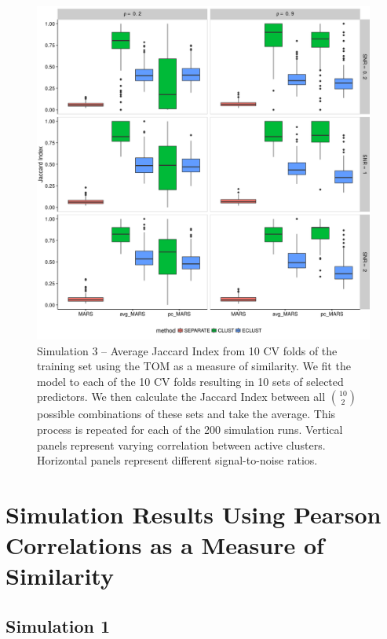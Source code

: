 \begin{figure}[H]
	\centering
	\includegraphics[scale=0.6, keepaspectratio]{./figs/hydra/results/figures/sim3-sept27/jacc_TOM_sim3.png}
	\caption{Simulation 3 -- Average Jaccard Index from 10 CV folds of the training set using the TOM as a measure of similarity. We fit the model to each of the 10 CV folds resulting in 10 sets of selected predictors. We then calculate the Jaccard Index between all $\binom{10}{2}$ possible combinations of these sets and take the average. This process is repeated for each of the 200 simulation runs. Vertical panels represent varying correlation between active clusters. Horizontal panels represent different signal-to-noise ratios.}
	\label{fig:jacc_TOM_sim3}
\end{figure}



\section{Simulation Results Using Pearson Correlations as a Measure of Similarity} \label{ap:sim-Corr}


\subsection*{Simulation 1}

